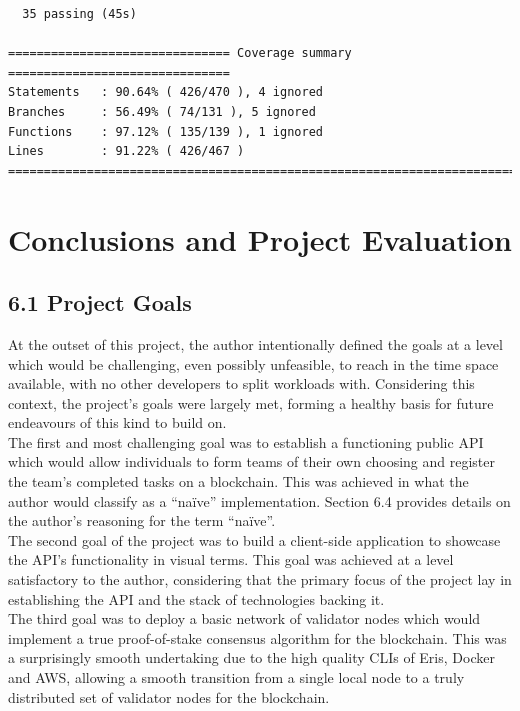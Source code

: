 \begin{lstlisting}
  35 passing (45s)

=============================== Coverage summary ===============================
Statements   : 90.64% ( 426/470 ), 4 ignored
Branches     : 56.49% ( 74/131 ), 5 ignored
Functions    : 97.12% ( 135/139 ), 1 ignored
Lines        : 91.22% ( 426/467 )
================================================================================
\end{lstlisting}


\chapter{Conclusions and Project
Evaluation}

\section{6.1 Project Goals}\label{project-goals-1}

At the outset of this project, the author intentionally defined the
goals at a level which would be challenging, even possibly unfeasible,
to reach in the time space available, with no other developers to split
workloads with. Considering this context, the project's goals were
largely met, forming a healthy basis for future endeavours of this kind
to build on.\\
The first and most challenging goal was to establish a functioning
public API which would allow individuals to form teams of their own
choosing and register the team's completed tasks on a blockchain. This
was achieved in what the author would classify as a ``naïve''
implementation. Section 6.4 provides details on the author's reasoning
for the term ``naïve''.\\
The second goal of the project was to build a client-side application to
showcase the API's functionality in visual terms. This goal was achieved
at a level satisfactory to the author, considering that the primary
focus of the project lay in establishing the API and the stack of
technologies backing it.\\
The third goal was to deploy a basic network of validator nodes which
would implement a true proof-of-stake consensus algorithm for the
blockchain. This was a surprisingly smooth undertaking due to the high
quality CLIs of Eris, Docker and AWS, allowing a smooth transition from
a single local node to a truly distributed set of validator nodes for
the blockchain.

